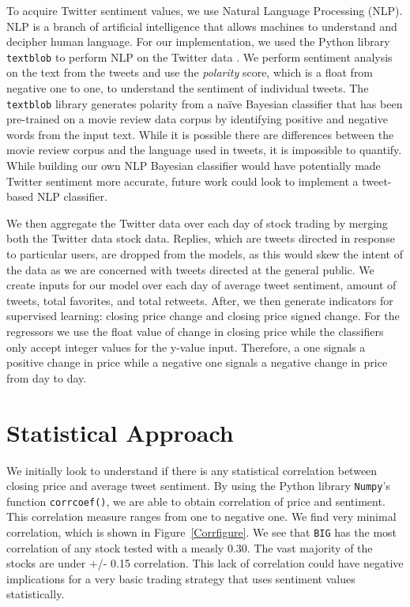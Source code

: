 \documentclass[../thesis.tex]{subfiles}
\begin{document}
To acquire Twitter sentiment values, we use Natural Language Processing (NLP). NLP is a branch of artificial intelligence that allows machines to understand and decipher human language. For our implementation, we used the Python library \texttt{textblob} to perform NLP on the Twitter data \cite{Loria2018}. We perform sentiment analysis on the text from the tweets and use the \textit{polarity} score, which is a float from negative one to one, to understand the sentiment of individual tweets. The \texttt{textblob} library generates polarity from a na\"{i}ve Bayesian classifier that has been pre-trained on a movie review data corpus by identifying positive and negative words from the input text. While it is possible there are differences between the movie review corpus and the language used in tweets, it is impossible to quantify. While building our own NLP Bayesian classifier would have potentially made Twitter sentiment more accurate, future work could look to implement a tweet-based NLP classifier. 

We then aggregate the Twitter data over each day of stock trading by merging both the Twitter data stock data. Replies, which are tweets directed in response to particular users, are dropped from the models, as this would skew the intent of the data as we are concerned with tweets directed at the general public. We create inputs for our model over each day of average tweet sentiment, amount of tweets, total favorites, and total retweets. After, we then generate indicators for supervised learning: closing price change and closing price signed change. For the regressors we use the float value of change in closing price while the classifiers only accept integer values for the y-value input. Therefore, a one signals a positive change in price while a negative one signals a negative change in price from day to day.  

\section{Statistical Approach}
We initially look to understand if there is any statistical correlation between closing price and average tweet sentiment. By using the Python library \texttt{Numpy}'s function \texttt{corrcoef()}, we are able to obtain correlation of price and sentiment. This correlation measure ranges from one to negative one. We find very minimal correlation, which is shown in Figure~\ref{Corrfigure}. We see that \texttt{BIG} has the most correlation of any stock tested with a measly 0.30. The vast majority of the stocks are under +/- 0.15 correlation. This lack of correlation could have negative implications for a very basic trading strategy that uses sentiment values statistically.
\end{document}

